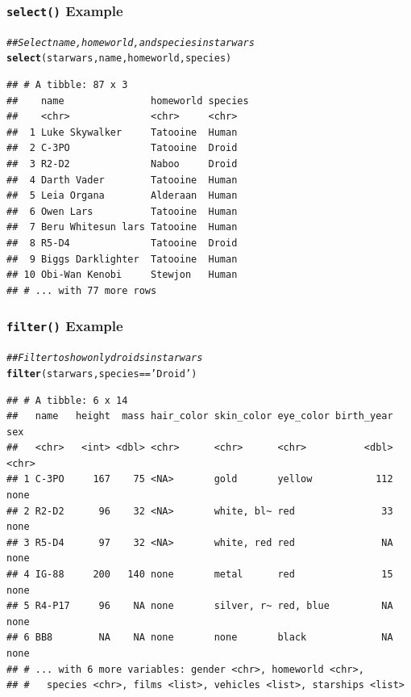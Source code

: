 \documentclass{beamer}\usepackage[]{graphicx}\usepackage[]{color}
\makeatletter
\newcommand{\hlstr}[1]{\textcolor[rgb]{0.192,0.494,0.8}{#1}}%
\newcommand{\hlcom}[1]{\textcolor[rgb]{0.678,0.584,0.686}{\textit{#1}}}%
\newcommand{\hlopt}[1]{\textcolor[rgb]{0,0,0}{#1}}%
\newcommand{\hlstd}[1]{\textcolor[rgb]{0.345,0.345,0.345}{#1}}%
\newcommand{\hlkwd}[1]{\textcolor[rgb]{0.737,0.353,0.396}{\textbf{#1}}}%
\newenvironment{kframe}{%
 \def\at@end@of@kframe{}%
 \ifinner\ifhmode%
  \def\at@end@of@kframe{\end{minipage}}%
  \begin{minipage}{\columnwidth}%
 \fi\fi%
 \def\FrameCommand##1{\hskip\@totalleftmargin \hskip-\fboxsep
 \colorbox{shadecolor}{##1}\hskip-\fboxsep
     \hskip-\linewidth \hskip-\@totalleftmargin \hskip\columnwidth}%
 \MakeFramed {\advance\hsize-\width
   \@totalleftmargin\z@ \linewidth\hsize
   \@setminipage}}%
 {\par\unskip\endMakeFramed%
 \at@end@of@kframe}
\newenvironment{knitrout}{}{} %
\makeatother
\begin{document}
\begin{frame}[fragile]\frametitle{\texttt{select()} Example}
\begin{knitrout}\footnotesize
{}\color{fgcolor}\begin{kframe}
\begin{alltt}
\hlcom{## Select name, homeworld, and species in starwars}
\hlkwd{select}\hlstd{(starwars, name, homeworld, species)}
\end{alltt}
\begin{verbatim}
## # A tibble: 87 x 3
##    name               homeworld species
##    <chr>              <chr>     <chr>  
##  1 Luke Skywalker     Tatooine  Human  
##  2 C-3PO              Tatooine  Droid  
##  3 R2-D2              Naboo     Droid  
##  4 Darth Vader        Tatooine  Human  
##  5 Leia Organa        Alderaan  Human  
##  6 Owen Lars          Tatooine  Human  
##  7 Beru Whitesun lars Tatooine  Human  
##  8 R5-D4              Tatooine  Droid  
##  9 Biggs Darklighter  Tatooine  Human  
## 10 Obi-Wan Kenobi     Stewjon   Human  
## # ... with 77 more rows
\end{verbatim}
\end{kframe}
\end{knitrout}
\end{frame}

\begin{frame}[fragile]\frametitle{\texttt{filter()} Example}
\begin{knitrout}\footnotesize
{}\color{fgcolor}\begin{kframe}
\begin{alltt}
\hlcom{## Filter to show only droids in starwars}
\hlkwd{filter}\hlstd{(starwars, species} \hlopt{==} \hlstr{'Droid'}\hlstd{)}
\end{alltt}
\begin{verbatim}
## # A tibble: 6 x 14
##   name   height  mass hair_color skin_color eye_color birth_year sex  
##   <chr>   <int> <dbl> <chr>      <chr>      <chr>          <dbl> <chr>
## 1 C-3PO     167    75 <NA>       gold       yellow           112 none 
## 2 R2-D2      96    32 <NA>       white, bl~ red               33 none 
## 3 R5-D4      97    32 <NA>       white, red red               NA none 
## 4 IG-88     200   140 none       metal      red               15 none 
## 5 R4-P17     96    NA none       silver, r~ red, blue         NA none 
## 6 BB8        NA    NA none       none       black             NA none 
## # ... with 6 more variables: gender <chr>, homeworld <chr>,
## #   species <chr>, films <list>, vehicles <list>, starships <list>
\end{verbatim}
\end{kframe}
\end{knitrout}
\end{frame}
\end{document}
